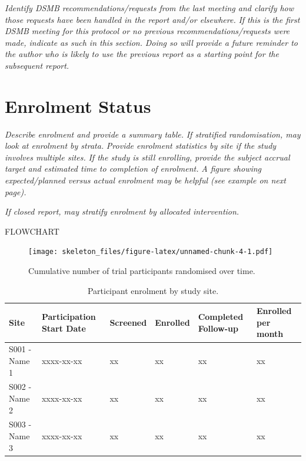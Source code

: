 \documentclass[
  11pt,
]{article}
\begin{document}
\emph{Identify DSMB recommendations/requests from the last meeting and clarify how those requests have been handled in the report and/or elsewhere.}
\emph{If this is the first DSMB meeting for this protocol or no previous recommendations/requests were made, indicate as such in this section.}
\emph{Doing so will provide a future reminder to the author who is likely to use the previous report as a starting point for the subsequent report.}

\clearpage

\hypertarget{enrolment-status}{%
\section{Enrolment Status}\label{enrolment-status}}

\emph{Describe enrolment and provide a summary table.}
\emph{If stratified randomisation, may look at enrolment by strata.}
\emph{Provide enrolment statistics by site if the study involves multiple sites.}
\emph{If the study is still enrolling, provide the subject accrual target and estimated time to completion of enrolment.}
\emph{A figure showing expected/planned versus actual enrolment may be helpful (see example on next page).}

\emph{If closed report, may stratify enrolment by allocated intervention.}

FLOWCHART

\begin{figure}
\centering
\texttt{[image: skeleton\_files/figure-latex/unnamed-chunk-4-1.pdf]}
\caption{\label{fig:unnamed-chunk-4}Cumulative number of trial participants randomised over time.}
\end{figure}

\begin{table}

\caption{\label{tab:unnamed-chunk-5}Participant enrolment by study site.}
\centering
\begin{tabular}[t]{l>{\raggedright\arraybackslash}p{2cm}>{\raggedleft\arraybackslash}p{2cm}>{\raggedleft\arraybackslash}p{2cm}>{\raggedleft\arraybackslash}p{2cm}>{\raggedleft\arraybackslash}p{2cm}}
\toprule
Site & Participation Start Date & Screened & Enrolled & Completed Follow-up & Enrolled per month\\
\midrule
S001 - Name 1 & xxxx-xx-xx & xx & xx & xx & xx\\
S002 - Name 2 & xxxx-xx-xx & xx & xx & xx & xx\\
S003 - Name 3 & xxxx-xx-xx & xx & xx & xx & xx\\
\bottomrule
\end{tabular}
\end{table}
\end{document}
